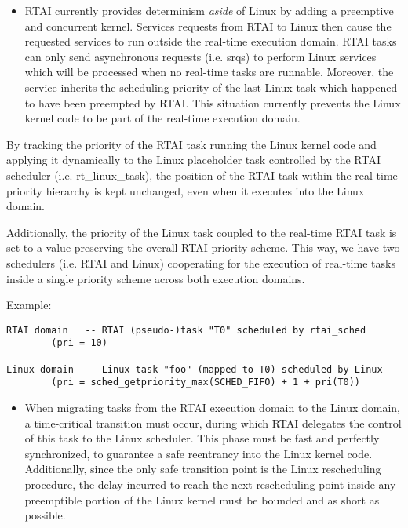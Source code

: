 \begin{itemize}

\item RTAI currently provides determinism \emph{aside} of Linux by adding a
preemptive and concurrent kernel. Services requests from RTAI to Linux
then cause the requested services to run outside the real-time
execution domain. RTAI tasks can only send asynchronous requests
(i.e. srqs) to perform Linux services which will be processed when no
real-time tasks are runnable.  Moreover, the service inherits the
scheduling priority of the last Linux task which happened to have been
preempted by RTAI. This situation currently prevents the Linux kernel
code to be part of the real-time execution domain.

\end{itemize}

By tracking the priority of the RTAI task running the Linux
kernel code and applying it dynamically to the Linux
placeholder task controlled by the RTAI scheduler
(i.e. rt\_linux\_task), the position of the RTAI task
within the real-time priority hierarchy is kept unchanged,
even when it executes into the Linux domain.

Additionally, the priority of the Linux task coupled to the
real-time RTAI task is set to a value preserving the overall
RTAI priority scheme.  This way, we have two schedulers
(i.e. RTAI and Linux) cooperating for the execution of
real-time tasks inside a single priority scheme across both
execution domains.

Example: 
\begin{verbatim}
RTAI domain   -- RTAI (pseudo-)task "T0" scheduled by rtai_sched
        (pri = 10)

Linux domain  -- Linux task "foo" (mapped to T0) scheduled by Linux
        (pri = sched_getpriority_max(SCHED_FIFO) + 1 + pri(T0))
\end{verbatim}
\begin{itemize}

\item When migrating tasks from the RTAI execution domain to the Linux
domain, a time-critical transition must occur, during which RTAI
delegates the control of this task to the Linux scheduler. This phase
must be fast and perfectly synchronized, to guarantee a safe
reentrancy into the Linux kernel code. Additionally, since the only
safe transition point is the Linux rescheduling procedure, the delay
incurred to reach the next rescheduling point inside any preemptible
portion of the Linux kernel must be bounded and as short as possible.

\end{itemize}

